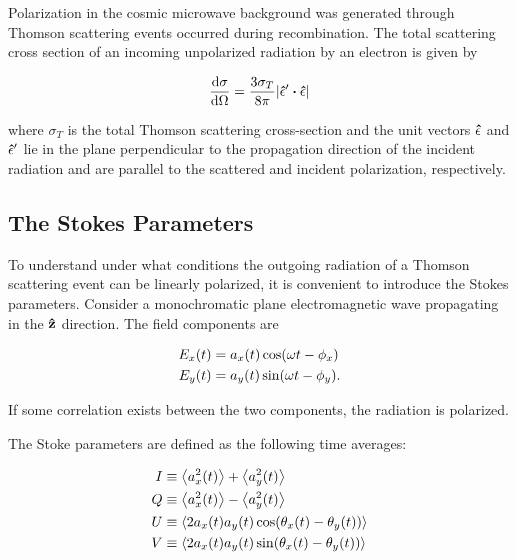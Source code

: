 Polarization in the cosmic microwave background was generated through
Thomson scattering events occurred during recombination. The total
scattering cross section of an incoming unpolarized radiation by an
electron is given by

\begin{equation}
        \dv{\sigma}{\Omega} = \frac{3\sigma_T}{8\pi}
        \abs{\vectorunit{\epsilon}' \vdot \vectorunit{\epsilon}}
        \label{eq:thomson_csection}
\end{equation}

where $\sigma_T$ is the total Thomson scattering cross-section and the unit
vectors $\vectorunit{\epsilon}$ and $\vectorunit{\epsilon}'$ lie in the
plane perpendicular to the propagation direction of the incident radiation
and are parallel to the scattered and incident polarization, respectively.

\subsection{The Stokes Parameters}

To understand under what conditions the outgoing radiation of a Thomson
scattering event can be linearly polarized, it is convenient to introduce the
Stokes parameters. Consider a monochromatic plane electromagnetic wave
propagating in the $\vectorunit{z}$ direction. The field components are

\begin{align}
        E_x\qty(t) & = a_x\qty(t)\cos(\omega t - \phi_x) \\
        E_y\qty(t) & = a_y\qty(t)\sin(\omega t - \phi_y).
\end{align}

If some correlation exists between the two components, the radiation is
polarized.

The Stoke parameters are defined as the following time averages:

\begin{align}
        I & \equiv \expval{a^2_x\qty(t)} + \expval{a^2_y\qty(t)} \\
        Q & \equiv \expval{a^2_x\qty(t)} - \expval{a^2_y\qty(t)} \\
        U & \equiv \expval{2a_x\qty(t)a_y\qty(t)
        \cos(\theta_x\qty(t) - \theta_y\qty(t))} \\
        V & \equiv \expval{2a_x\qty(t)a_y\qty(t)
        \sin(\theta_x\qty(t) - \theta_y\qty(t))}
\end{align}

